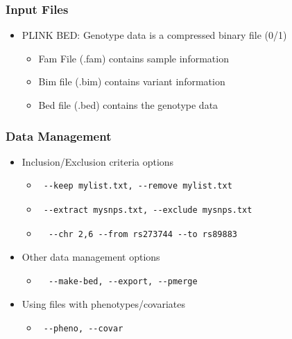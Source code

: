 \documentclass{beamer}
\begin{document}
\begin{frame}
\frametitle{\bf Input Files}
\begin{itemize}
\item PLINK BED: Genotype data is a compressed binary file (0/1)
\begin{itemize}
\item Fam File (.fam)  contains sample information
\item Bim file (.bim) contains variant information
\item Bed file (.bed) contains the genotype data
\end{itemize}
\end{itemize}
\end{frame}


\begin{frame}[fragile]
\frametitle{\bf Data Management}
\begin{itemize}
\item Inclusion/Exclusion criteria options
\begin{itemize}
\item   \begin{verbatim} --keep mylist.txt, --remove mylist.txt  \end{verbatim}
\item \begin{verbatim} --extract mysnps.txt, --exclude mysnps.txt \end{verbatim}
\item \begin{verbatim}  --chr 2,6 --from rs273744 --to rs89883 \end{verbatim}
\end{itemize}
\item  Other data management options
\begin{itemize}
\item \begin{verbatim}  --make-bed, --export, --pmerge \end{verbatim}
\end{itemize}
\item Using files with phenotypes/covariates
\begin{itemize}
\item  \begin{verbatim} --pheno, --covar \end{verbatim}
\end{itemize}
\end{itemize}
\end{frame}
\end{document}
